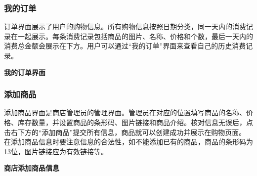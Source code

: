 \documentclass{article}
\begin{document}
\subsubsection{我的订单}

订单界面展示了用户的购物信息。所有购物信息按照日期分类，同一天内的消费记录在一起展示。每条消费记录包括商品的图片、名称、价格和个数，最后一天内的消费总金额会展示在下方。用户可以通过“我的订单”界面来查看自己的历史消费记录。

\begin{center}
\textbf{我的订单界面}
\end{center}

\subsubsection{添加商品}

添加商品界面是商店管理员的管理界面。管理员在对应的位置填写商品的名称、价格、库存数量，并设置商品的条形码、图片链接和商品介绍。核对信息无误后，点击右下方的“添加商品”提交所有信息，商品就可以创建成功并展示在购物页面。\\
在添加商品信息时要注意信息的合法性，如不能添加已有的商品，商品的条形码为13位，图片链接应为有效链接等。

\begin{center}
\textbf{商店添加商品信息}
\end{center}
\end{document}
